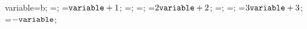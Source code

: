 \documentclass[exercice]{thedocument}%
\begin{document}
%
    \>variable=b;%
    =;%
    =${\<variable;}+1$;%
    =;%
    =;%
    =$2{\<variable;}+2$;%
    =;%
    =;%
    =$3{\<variable;}+3$;%
    =$-{\<variable;}$;%
\end{document}
